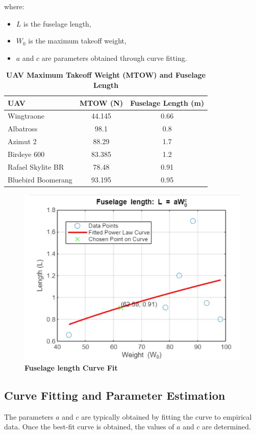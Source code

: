 \documentclass[12 pt]{article}
\begin{document}
{where:
\begin{itemize}
    \item \(L\) is the fuselage length,
    \item \(W_0\) is the maximum takeoff weight,
    \item \(a\) and \(c\) are parameters obtained through curve fitting.
\end{itemize}
\begin{table}[htbp]
  \centering
  \caption{\textbf{UAV Maximum Takeoff Weight (MTOW) and Fuselage Length}}
  \begin{tabular}{|l|c|c|}
    \hline
    \textbf{UAV} & \textbf{MTOW (N)} & \textbf{Fuselage Length (m)} \\
    \hline
    Wingtraone & 44.145 & 0.66 \\
    Albatross & 98.1 & 0.8 \\
    Azimut 2 & 88.29 & 1.7 \\
    Birdeye 600 & 83.385 & 1.2 \\
    Rafael Skylite BR & 78.48 & 0.91 \\
    Bluebird Boomerang & 93.195 & 0.95 \\
    \hline
  \end{tabular}
\end{table}
\begin{figure}[H]
    \centering
    \includegraphics[width=\linewidth]{Codes/Week 6/Fuselage length curve fit.jpg}
    \caption{\textbf{Fuselage length Curve Fit}}
    \label{Fuselage length curve fit}
\end{figure}
\color{red}
\subsection{Curve Fitting and Parameter Estimation}
\color{black}
The parameters \(a\) and \(c\) are typically obtained by fitting the curve to empirical data. Once the best-fit curve is obtained, the values of \(a\) and \(c\) are determined. 

}
\end{document}
